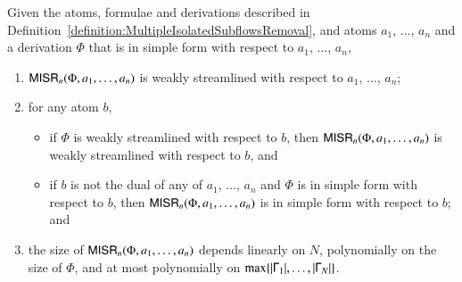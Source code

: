 \begin{proposition}\label{proposition:MultipleIsolatedSubflowRemover}
Given the atoms, formulae and derivations described in Definition~\vref{definition:MultipleIsolatedSubflowsRemoval}, and atoms $a_1$, $\dots$, $a_n$ and a derivation $\Phi$ that is in simple form with respect to $a_1$, $\dots$, $a_n$,
\begin{enumerate}
\item $\mathsf{MISR}_n(\Phi,a_1,\dots,a_n)$ is weakly streamlined with respect to $a_1$, $\dots$, $a_n$;
\item for any atom $b$,
\begin{itemize}
\item if $\Phi$ is weakly streamlined with respect to $b$, then $\mathsf{MISR}_n(\Phi,a_1,\dots,a_n)$ is weakly streamlined with respect to $b$, and
\item if $b$ is not the dual of any of $a_1$, $\dots$, $a_n$ and $\Phi$ is in simple form with respect to $b$, then $\mathsf{MISR}_n(\Phi,a_1,\dots,a_n)$ is in simple form with respect to $b$; and
\end{itemize}
\item the size of\/ $\mathsf{MISR}_n(\Phi,a_1,\dots,a_n)$ depends linearly on $N$, polynomially on the size of\/ $\Phi$, and at most polynomially on $\max\{{\left\vert \mathsf\Gamma_1\right\vert},\dots,{\left\vert \mathsf\Gamma_N\right\vert}\}$.
\end{enumerate}
\end{proposition}

